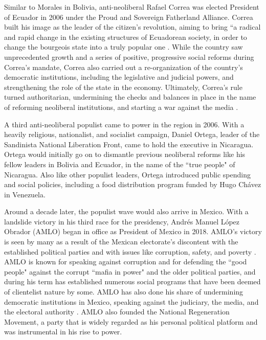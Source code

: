 \documentclass[12pt,letterpaper]{article}
\begin{document}
Similar to Morales in Bolivia, anti-neoliberal Rafael Correa was elected President of Ecuador in 2006 under the Proud and Sovereign Fatherland Alliance. Correa built his image as the leader of the citizen's revolution, aiming to bring “a radical and rapid change in the existing structures of Ecuadorean society, in order to change the bourgeois state into a truly popular one\autocite{torrePeopleDemocracyAuthoritarianism2014} . While the country saw unprecedented growth and a series of positive, progressive social reforms during Correa's mandate, Correa also carried out a re-organization of the country's democratic institutions, including the legislative and judicial powers, and strengthening the role of the state in the economy. Ultimately, Correa's rule turned authoritarian, undermining the checks and balances in place in the name of reforming neoliberal institutions, and starting a war against the media\autocite{torrePeopleDemocracyAuthoritarianism2014} . 

A third anti-neoliberal populist came to power in the region in 2006. With a heavily religious, nationalist, and socialist campaign, Daniel Ortega, leader of the Sandinista National Liberation Front, came to hold the executive in Nicaragua. Ortega would initially go on to dismantle previous neoliberal reforms like his fellow leaders in Bolivia and Ecuador, in the name of the ``true people" of Nicaragua. Also like other populist leaders, Ortega introduced public spending and social policies, including a food distribution program funded by Hugo Chávez in Venezuela. 

Around a decade later, the populist wave would also arrive in Mexico. With a landslide victory in his third race for the presidency, Andrés Manuel López Obrador (AMLO) began in office as President of Mexico in 2018. AMLO's victory is seen by many as a result of the Mexican electorate's discontent with the established political parties and with issues like corruption, safety, and poverty\autocite{morenoVirajeElectoralOpinion} . AMLO is known for speaking against corruption and for defending the ``good people" against the corrupt ``mafia in power" and the older political parties, and during his term has established numerous social programs that have been deemed of clientelist nature by some. AMLO has also done his share of undermining democratic institutions in Mexico, speaking against the judiciary, the media, and the electoral authority\autocite{paulinaAMLOInstitutionsHow} . AMLO also founded the National Regeneration Movement, a party that is widely regarded as his personal political platform and was instrumental in his rise to power.
\end{document}
